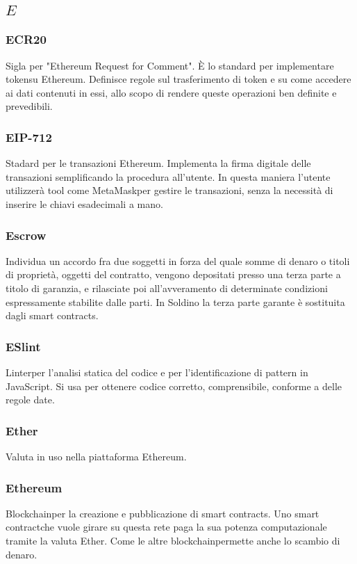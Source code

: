 \subsection*{\quad$E\quad$}
\subsubsection*{ECR20}
Sigla per "Ethereum Request for Comment". È lo standard per implementare token\glosp su Ethereum. Definisce regole sul trasferimento di token e su come accedere ai dati contenuti in essi, allo scopo di rendere queste operazioni ben definite e prevedibili.

\subsubsection*{EIP-712}
Stadard per le transazioni Ethereum. Implementa la firma digitale delle transazioni semplificando la procedura all'utente. In questa maniera l'utente utilizzerà tool come MetaMask\glosp per gestire le transazioni, senza la necessità di inserire le chiavi esadecimali a mano.

\subsubsection*{Escrow}
Individua un accordo fra due soggetti in forza del quale somme di denaro o titoli di proprietà, oggetti del contratto, vengono depositati presso una terza parte a titolo di garanzia, e rilasciate poi all'avveramento di determinate condizioni espressamente stabilite dalle parti. In Soldino la terza parte garante è sostituita dagli smart contracts\glo.

\subsubsection*{ESlint}
Linter\glo per l’analisi statica del codice e per l’identificazione di pattern in JavaScript. Si usa per ottenere codice corretto, comprensibile, conforme a delle regole date.

\subsubsection*{Ether}
Valuta in uso nella piattaforma Ethereum\glo.

\subsubsection*{Ethereum}
Blockchain\glosp per la creazione e pubblicazione di smart contracts\glo. Uno smart contract\glosp che vuole girare su questa rete paga la sua potenza computazionale tramite la valuta Ether. Come le altre blockchain\glosp permette anche lo scambio di denaro.

